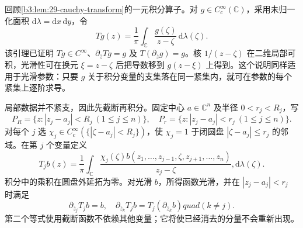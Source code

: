 回顾\cref{b3:lem:29-cauchy-transform}的一元积分算子。对 \(g\in C_c^\infty(\mathbb C)\)，采用未归一化面积 \(\mathrm d\lambda=\mathrm dx\,\mathrm dy\)，令
\[
 Tg(z)=\frac1\pi\int_{\mathbb C}\frac{g(\zeta)}{z-\zeta}\,
             \mathrm d\lambda(\zeta).
\]
该引理已证明 \(Tg\in C^\infty\)、\(\partial_{\overline z}Tg=g\) 及 \(T(\partial_{\overline z}g)=g\)。核 \(1/(z-\zeta)\) 在二维局部可积，光滑性可在换元 \(\xi=z-\zeta\) 后把导数移到 \(g(z-\xi)\) 上得到。这个说明同样适用于光滑参数：只要 \(g\) 关于积分变量的支集落在同一紧集内，就可在参数的每个紧集上逐阶求导。

局部数据并不紧支，因此先截断再积分。固定中心 \(a\in\mathbb C^n\) 及半径 \(0<r_j<R_j\)，写
\[
 P_R=\{z:|z_j-a_j|<R_j\ (1\le j\le n)\},\quad
 P_r=\{z:|z_j-a_j|<r_j\ (1\le j\le n)\}.
\]
对每个 \(j\) 选 \(\chi_j\in C_c^\infty(\{|\zeta-a_j|<R_j\})\)，使 \(\chi_j=1\) 于闭圆盘 \(|\zeta-a_j|\le r_j\) 的邻域。在第 \(j\) 个变量定义
\begin{equation}\label{b3:eq:29-local-cauchy-operator}
 T_j b(z)=\frac1\pi\int_{\mathbb C}
 \frac{\chi_j(\zeta)b(z_1,\ldots,z_{j-1},\zeta,z_{j+1},\ldots,z_n)}{z_j-\zeta},
 \mathrm d\lambda(\zeta).
\end{equation}
积分中的乘积在圆盘外延拓为零。对光滑 \(b\)，所得函数光滑，并在 \(|z_j-a_j|<r_j\) 时满足
\[
 \partial_{\overline z_j}T_jb=b,\quad
 \partial_{\overline z_k}T_jb=T_j(\partial_{\overline z_k}b)quad(k\ne j).
\]
第二个等式使用截断函数不依赖其他变量；它将使已经消去的分量不会重新出现。

